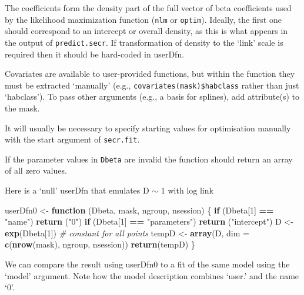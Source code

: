 \documentclass[
]{book}
\newenvironment{Shaded}{\begin{snugshade}}{\end{snugshade}}
\newcommand{\AttributeTok}[1]{\textcolor[rgb]{0.13,0.29,0.53}{#1}}
\newcommand{\CommentTok}[1]{\textcolor[rgb]{0.56,0.35,0.01}{\textit{#1}}}
\newcommand{\ControlFlowTok}[1]{\textcolor[rgb]{0.13,0.29,0.53}{\textbf{#1}}}
\newcommand{\DecValTok}[1]{\textcolor[rgb]{0.00,0.00,0.81}{#1}}
\newcommand{\FunctionTok}[1]{\textcolor[rgb]{0.13,0.29,0.53}{\textbf{#1}}}
\newcommand{\NormalTok}[1]{#1}
\newcommand{\OtherTok}[1]{\textcolor[rgb]{0.56,0.35,0.01}{#1}}
\newcommand{\SpecialCharTok}[1]{\textcolor[rgb]{0.81,0.36,0.00}{\textbf{#1}}}
\newcommand{\StringTok}[1]{\textcolor[rgb]{0.31,0.60,0.02}{#1}}
\begin{document}
The coefficients form the density part of the full vector of beta coefficients used by the likelihood maximization function (\texttt{nlm} or \texttt{optim}). Ideally, the first one should correspond to an intercept or overall density, as this is what appears in the output of \texttt{predict.secr}. If transformation of density to the `link' scale is required then it should be
hard-coded in userDfn.

Covariates are available to user-provided functions, but within the function they must be extracted `manually' (e.g., \texttt{covariates(mask)\$habclass} rather than just `habclass'). To pass other arguments (e.g., a basis for splines),
add attribute(s) to the mask.

It will usually be necessary to specify starting values for optimisation manually with the start argument of \texttt{secr.fit}.

If the parameter values in \texttt{Dbeta} are invalid the function should return an array of all zero values.

Here is a `null' userDfn that emulates D \(\sim\) 1 with log link

\begin{Shaded}
\begin{Highlighting}[]
\NormalTok{userDfn0 }\OtherTok{\textless{}{-}} \ControlFlowTok{function}\NormalTok{ (Dbeta, mask, ngroup, nsession) \{}
    \ControlFlowTok{if}\NormalTok{ (Dbeta[}\DecValTok{1}\NormalTok{] }\SpecialCharTok{==} \StringTok{"name"}\NormalTok{) }\FunctionTok{return}\NormalTok{ (}\StringTok{"0"}\NormalTok{)}
    \ControlFlowTok{if}\NormalTok{ (Dbeta[}\DecValTok{1}\NormalTok{] }\SpecialCharTok{==} \StringTok{"parameters"}\NormalTok{) }\FunctionTok{return}\NormalTok{ (}\StringTok{"intercept"}\NormalTok{)}
\NormalTok{    D }\OtherTok{\textless{}{-}} \FunctionTok{exp}\NormalTok{(Dbeta[}\DecValTok{1}\NormalTok{])   }\CommentTok{\# constant for all points}
\NormalTok{    tempD }\OtherTok{\textless{}{-}} \FunctionTok{array}\NormalTok{(D, }\AttributeTok{dim =} \FunctionTok{c}\NormalTok{(}\FunctionTok{nrow}\NormalTok{(mask), ngroup, nsession))}
    \FunctionTok{return}\NormalTok{(tempD)}
\NormalTok{\}}
\end{Highlighting}
\end{Shaded}

We can compare the result using userDfn0 to a fit of the same model using the `model' argument. Note how the model description combines `user.' and the name `0'.
\end{document}
